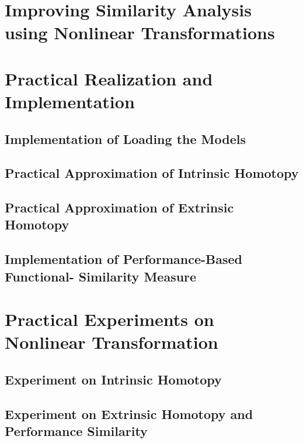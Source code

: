 \documentclass[a4paper, fontsize=12pt,
parskip=half,	%
department=FakIM,  %
twoside, %
DIV=15,BCOR=10mm, %
]{OTHRreprt}%
\begin{document}
        \chapter{Improving Similarity Analysis using Nonlinear Transformations}\label{ISA}
        
    \chapter{Practical Realization and Implementation}\label{sec:PRaI}
    
             \section{Implementation of Loading the Models}
         
         \newpage
         \section{Practical Approximation of Intrinsic Homotopy}
        
         \section{Practical Approximation of Extrinsic Homotopy}
         
         
         
        \section{Implementation of Performance-Based Functional- Similarity Measure}
         
	\chapter{Practical Experiments on Nonlinear Transformation }\label{exp}
            
        \section{Experiment on Intrinsic Homotopy}\label{exp:IntrinsicHOm}
       
       \newpage
            \section{Experiment on Extrinsic Homotopy and Performance Similarity}\label{exp:ExtrinsicHom}
            
\end{document}
